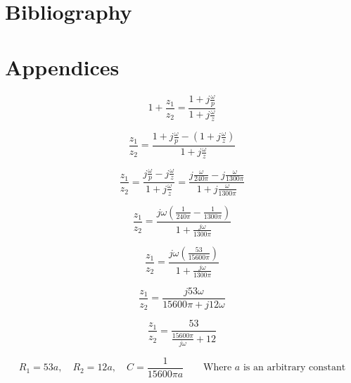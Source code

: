 \documentclass[12pt]{article} %
\begin{document}
\pagebreak




\section{Bibliography}


\pagebreak





\section{Appendices}

\begin{equation}
	1 + \frac{z_1}{z_2} = \frac{1+j\frac{\omega}{p}}{1+j\frac{\omega}{z}}
\end{equation}

\begin{equation}
	\frac{z_1}{z_2} = \frac{1+j\frac{\omega}{p}-(1+j\frac{\omega}{z})}{1+j\frac{\omega}{z}}
\end{equation}

\begin{equation}
	\frac{z_1}{z_2} = \frac{j\frac{\omega}{p}-j\frac{\omega}{z}}{1+j\frac{\omega}{z}} = \frac{j\frac{\omega}{240\pi}-j\frac{\omega}{1300\pi}}{1+j\frac{\omega}{1300\pi}} 
\end{equation}

\begin{equation}
	\frac{z_1}{z_2} = \frac{j\omega(\frac{1}{240\pi}-\frac{1}{1300\pi})}{1+\frac{j\omega}{1300\pi}}
\end{equation}

\begin{equation}
	\frac{z_1}{z_2} = \frac{j\omega(\frac{53}{15600\pi})}{1+\frac{j\omega}{1300\pi}}
\end{equation}

\begin{equation}
	\frac{z_1}{z_2} = \frac{j53\omega}{15600\pi+j12\omega}
\end{equation}

\begin{equation}
	\frac{z_1}{z_2} = \frac{53}{\frac{15600\pi}{j\omega}+12}
\end{equation}

\begin{equation}
	R_1 = 53a,\quad
	R_2 = 12a,\quad
	C = \frac{1}{15600\pi a}\quad\quad
	\textrm{Where }a\textrm{ is an arbitrary constant}
\end{equation}
\end{document}
